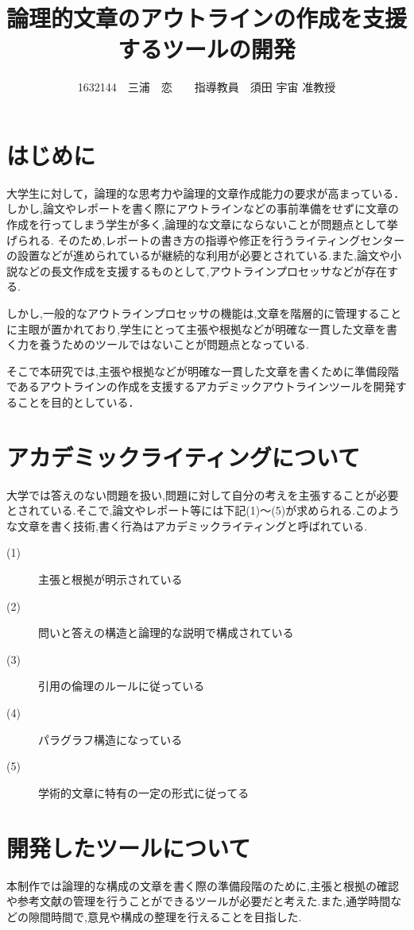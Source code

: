 \documentclass[twocolumn,10pt,a4j]{jsarticle}
\title{論理的文章のアウトラインの作成を支援するツールの開発}
\author{1632144　三浦　恋　　指導教員　須田 宇宙 准教授}
\date{}
\begin{document}
\maketitle

\section{はじめに}

大学生に対して，論理的な思考力や論理的文章作成能力の要求が高まっている．
しかし,論文やレポートを書く際にアウトラインなどの事前準備をせずに文章の作成を行ってしまう学生が多く,論理的な文章にならないことが問題点として挙げられる.
そのため,レポートの書き方の指導や修正を行うライティングセンターの設置などが進められているが継続的な利用が必要とされている.また,論文や小説などの長文作成を支援するものとして,アウトラインプロセッサなどが存在する.

しかし,一般的なアウトラインプロセッサの機能は,文章を階層的に管理することに主眼が置かれており,学生にとって主張や根拠などが明確な一貫した文章を書く力を養うためのツールではないことが問題点となっている.

そこで本研究では,主張や根拠などが明確な一貫した文章を書くために準備段階であるアウトラインの作成を支援するアカデミックアウトラインツールを開発することを目的としている．

\section{アカデミックライティングについて}
大学では答えのない問題を扱い,問題に対して自分の考えを主張することが必要とされている.そこで,論文やレポート等には下記(1)〜(5)が求められる.このような文章を書く技術,書く行為はアカデミックライティングと呼ばれている\cite{ren01}.

\begin{description}
  \item[(1)] 主張と根拠が明示されている
  \item[(2)] 問いと答えの構造と論理的な説明で構成されている
  \item[(3)] 引用の倫理のルールに従っている
  \item[(4)] パラグラフ構造になっている
  \item[(5)] 学術的文章に特有の一定の形式に従ってる
\end{description}

\section{開発したツールについて}
本制作では論理的な構成の文章を書く際の準備段階のために,主張と根拠の確認や参考文献の管理を行うことができるツールが必要だと考えた.また,通学時間などの隙間時間で,意見や構成の整理を行えることを目指した.
\end{document}
